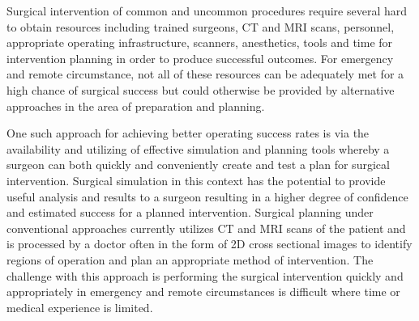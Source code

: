 





Surgical intervention of common and uncommon procedures require several hard to obtain resources including trained surgeons, CT and MRI scans, personnel, appropriate operating infrastructure, scanners, anesthetics, tools and time for intervention planning in order to produce successful outcomes. For emergency and remote circumstance, not all of these resources can be adequately met for a high chance of surgical success but could otherwise be provided by alternative approaches in the area of preparation and planning.

One such approach for achieving better operating success rates is via the availability and utilizing of effective simulation and planning tools whereby a surgeon can both quickly and conveniently create and test a plan for surgical intervention. Surgical simulation in this context has the potential to provide useful analysis and results to a surgeon resulting in a higher degree of confidence and estimated success for a planned intervention. Surgical planning under conventional approaches currently utilizes CT and MRI scans of the patient and is processed by a doctor often in the form of 2D cross sectional images to identify regions of operation and plan an appropriate method of intervention. The challenge with this approach is performing the surgical intervention quickly and appropriately in emergency and remote circumstances is difficult where time or medical experience is limited.

